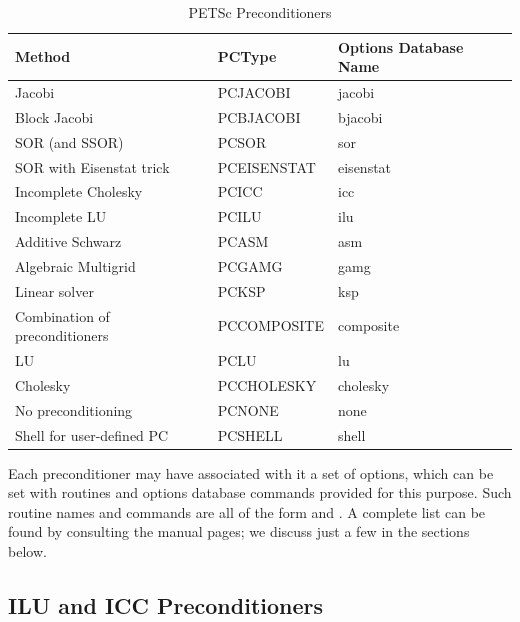 \begin{table}
\begin{center}
\begin{tabular}{lll}
{\bf Method}    &{\bf PCType}   & {\bf Options Database Name}\\
\hline
Jacobi                               & PCJACOBI      & jacobi\\
Block Jacobi                         & PCBJACOBI     & bjacobi\\
SOR (and SSOR)                       & PCSOR         & sor\\
SOR with Eisenstat trick             & PCEISENSTAT   & eisenstat\\
Incomplete Cholesky                  & PCICC         & icc\\
Incomplete LU                        & PCILU         & ilu\\
Additive Schwarz                     & PCASM         & asm\\
Algebraic Multigrid                    & PCGAMG         & gamg\\
Linear solver                        & PCKSP         & ksp \\
Combination of preconditioners       & PCCOMPOSITE   & composite \\
\hline
LU                                   & PCLU          & lu\\
Cholesky                             & PCCHOLESKY    & cholesky\\
No preconditioning                   & PCNONE        & none\\
Shell for user-defined PC            & PCSHELL       & shell\\
\hline
\end{tabular}
\end{center}
\caption{PETSc Preconditioners}
\label{tab_pcdefaults}
\end{table}

Each preconditioner may have associated with it a set of options,
which can be set with routines and options database commands provided
for this purpose.  Such routine names and commands are all of the form
 and .  A
complete list can be found by consulting the manual pages; we discuss
just a few in the sections below.

\subsection{ILU and ICC Preconditioners}
\label{sec_ilu_icc}

